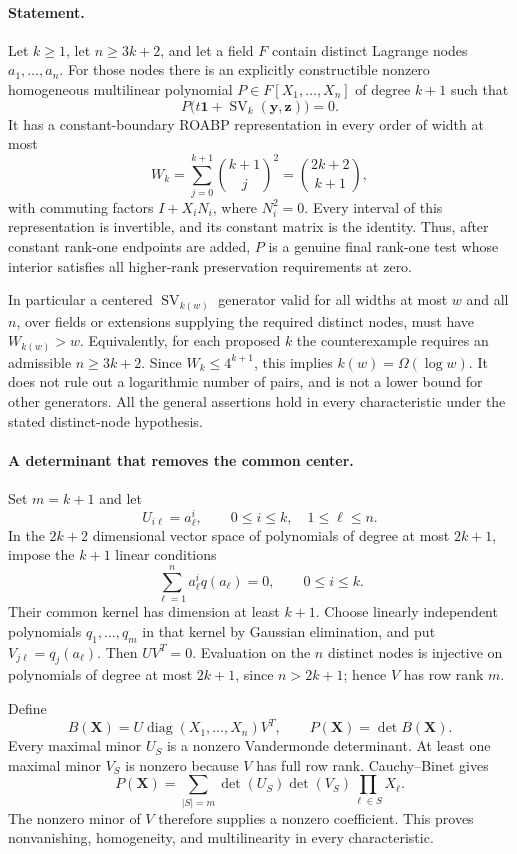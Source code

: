\documentclass[11pt,a4paper]{article}
\theoremstyle{definition}\newtheorem{definition}{Definition}
\begin{document}
\paragraph{Statement.}
Let $k\ge1$, let $n\ge3k+2$, and let a field $F$ contain
distinct Lagrange nodes $a_1,\ldots,a_n$.  For those nodes there
is an explicitly constructible nonzero homogeneous multilinear
polynomial $P\in F[X_1,\ldots,X_n]$ of degree $k+1$ such that
\[
 P\bigl(t\mathbf1+\operatorname{SV}_k(\mathbf y,\mathbf z)\bigr)=0.
 \tag{I.32}\label{eq:I-centered-sv-zero}
\]
It has a constant-boundary ROABP representation in every order
of width at most
\[
 W_k=\sum_{j=0}^{k+1}\binom{k+1}{j}^{\!2}
       =\binom{2k+2}{k+1},
 \tag{I.33}\label{eq:I-centered-sv-width}
\]
with commuting factors $I+X_iN_i$, where $N_i^2=0$.
Every interval of this representation is invertible, and its
constant matrix is the identity.  Thus, after constant
rank-one endpoints are added, $P$ is a genuine final rank-one
test whose interior satisfies all higher-rank preservation
requirements at zero.

In particular a centered $\operatorname{SV}_{k(w)}$ generator
valid for all widths at most $w$ and all $n$, over fields or
extensions supplying the required distinct nodes, must have
$W_{k(w)}>w$.  Equivalently, for each proposed $k$ the
counterexample requires an admissible $n\ge3k+2$.
Since $W_k\le4^{k+1}$, this implies
$k(w)=\Omega(\log w)$.  It does not rule out a logarithmic
number of pairs, and is not a lower bound for other generators.
All the general assertions hold in every characteristic under
the stated distinct-node hypothesis.

\paragraph{A determinant that removes the common center.}
Set $m=k+1$ and let
\[
 U_{i\ell}=a_\ell^i,\qquad 0\le i\le k,\quad1\le\ell\le n.
\]
In the $2k+2$ dimensional vector space of polynomials of degree
at most $2k+1$, impose the $k+1$ linear conditions
\[
 \sum_{\ell=1}^n a_\ell^i q(a_\ell)=0,
       \qquad0\le i\le k.
\]
Their common kernel has dimension at least $k+1$.
Choose linearly independent polynomials
$q_1,\ldots,q_m$ in that kernel by Gaussian elimination, and
put $V_{j\ell}=q_j(a_\ell)$.  Then $UV^T=0$.
Evaluation on the $n$ distinct nodes is injective on polynomials
of degree at most $2k+1$, since $n>2k+1$; hence $V$ has row
rank $m$.

Define
\[
 B(\mathbf X)=U\operatorname{diag}(X_1,\ldots,X_n)V^T,
 \qquad P(\mathbf X)=\det B(\mathbf X).
 \tag{I.34}
\]
Every maximal minor $U_S$ is a nonzero Vandermonde determinant.
At least one maximal minor $V_S$ is nonzero because $V$ has
full row rank.  Cauchy--Binet gives
\[
 P(\mathbf X)=\sum_{|S|=m}\det(U_S)\det(V_S)
                                  \prod_{\ell\in S}X_\ell.
\]
The nonzero minor of $V$ therefore supplies a nonzero coefficient.
This proves nonvanishing, homogeneity, and multilinearity in
every characteristic.
\end{document}
